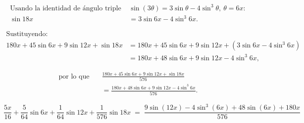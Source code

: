 $$
\begin{aligned}
\text{Usando la identidad de ángulo triple } &\sin(3\theta)=3\sin\theta-4\sin^{3}\theta,
\ \theta=6x: \\[4pt]
\sin 18x &= 3\sin 6x - 4\sin^{3}6x.
\end{aligned}
$$

$$
\begin{aligned}
\text{Sustituyendo: } &\\[4pt]
180x + 45\sin 6x + 9\sin 12x + \sin 18x
&= 180x + 45\sin 6x + 9\sin 12x + (3\sin 6x - 4\sin^{3}6x) \\[4pt]
&= 180x + 48\sin 6x + 9\sin 12x - 4\sin^{3}6x,
\end{aligned}
$$

$$
\begin{aligned}
\text{por lo que} \quad &
\frac{180x + 45\sin 6x + 9\sin 12x + \sin 18x}{576} \\[4pt]
&= \frac{180x + 48\sin 6x + 9\sin 12x - 4\sin^{3}6x}{576}.
\end{aligned}
$$

$$
\boxed{\displaystyle
\frac{5x}{16}
+ \frac{5}{64}\sin 6x
+ \frac{1}{64}\sin 12x
+ \frac{1}{576}\sin 18x
\;=\;
\frac{9 \sin(12x) - 4 \sin^{3}(6x) + 48 \sin(6x) + 180x}{576}
}
$$

